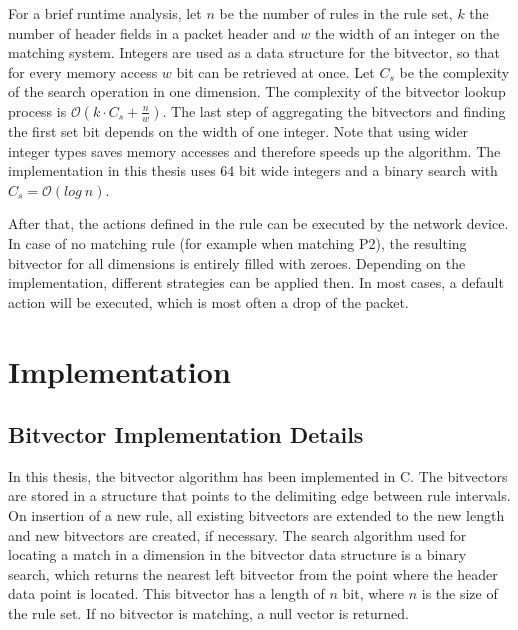 \documentclass[conference]{IEEEtran}
\begin{document}
For a brief runtime analysis, let $n$ be the number of rules in the rule set, 
$k$ the number of header fields in a packet header and $w$ the width of an integer on the matching system.
Integers are used as a data structure for the bitvector, so that for every memory access $w$ bit can be retrieved at once.
Let $C_s$ be the complexity of the search operation in one dimension.
The complexity of the bitvector lookup process is $\mathcal O(k \cdot C_s + \frac{n}{w})$.
The last step of aggregating the bitvectors and finding the first set bit depends on the width of one integer.
Note that using wider integer types saves memory accesses and therefore speeds up the algorithm.
The implementation in this thesis uses 64 bit wide integers and a binary search with $C_s = \mathcal O(log\ n)$.

After that, the actions defined in the rule can be executed by the network device.
In case of no matching rule (for example when matching P2), the resulting bitvector for all dimensions is entirely filled with zeroes.
Depending on the implementation, different strategies can be applied then.
In most cases, a default action will be executed, 
which is most often a drop of the packet.

\section{Implementation}
\subsection{Bitvector Implementation Details}
In this thesis, the bitvector algorithm has been implemented in C.
The bitvectors are stored in a structure that points to the delimiting edge
between rule intervals.
On insertion of a new rule, all existing bitvectors are extended to the new length and new bitvectors 
are created, if necessary.
The search algorithm used for locating a match in a dimension in the bitvector 
data structure is a binary search, which returns the nearest left bitvector from the point where 
the header data point is located.
This bitvector has a length of $n$ bit, where $n$ is the size of the rule set.
If no bitvector is matching, a null vector is returned.
\end{document}
